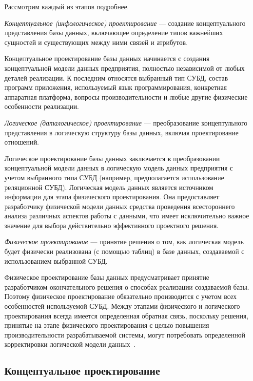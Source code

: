 Рассмотрим каждый из этапов подробнее.

\textit{Концептуальное (инфологическое) проектирование} --- создание концептуального
представления базы данных, включающее определение типов важнейших сущностей и существующих
между ними связей и атрибутов.

Концептуальное проектирование базы данных начинается с создания концептуальной
модели данных предприятия, полностью независимой от любых деталей
реализации. К последним относятся выбранный тип СУБД,
состав программ приложения, используемый язык программирования, конкретная аппаратная
платформа, вопросы производительности и любые другие физические особенности реализации.

\textit{Логическое (даталогическое) проектирование} --- преобразование
концептульного представления в логическую структуру базы данных,
включая проектирование отношений.

Логическое проектирование базы данных заключается в преобразовании
концептуальной модели данных в логическую модель данных предприятия с учетом
выбранного типа СУБД (например, предполагается использование
реляционной СУБД). Логическая модель данных является источником информации
для этапа физического проектирования. Она предоставляет разработчику
физической модели данных средства проведения всестороннего анализа различных
аспектов работы с данными, что имеет исключительно важное значение для
выбора действительно эффективного проектного решения.

\textit{Физическое проектирование} --- принятие решения о том, как логическая модель
будет физически реализована (с помощью таблиц) в базе данных, создаваемой
с использованием выбранной СУБД.

Физическое проектирование базы данных предусматривает принятие разработчиком
окончательного решения о способах реализации создаваемой базы. Поэтому
физическое проектирование обязательно производится с учетом всех особенностей
используемой СУБД. Между этапами физического и логического проектирования
всегда имеется определенная обратная связь, поскольку решения,
принятые на этапе физического проектирования с целью повышения производительности
разрабатываемой системы, могут потребовать определенной корректировки логической
модели данных~\cite{konnolli03}.

\subsection{Концептуальное проектирование}
\label{sub:db_structure_concept_design}

